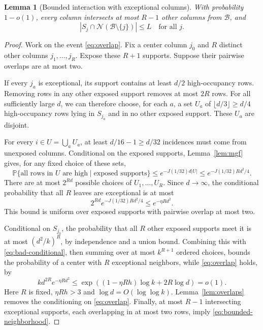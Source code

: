 \documentclass[11pt]{article}
\newtheorem{lemma}[theorem]{Lemma}
\theoremstyle{definition}
\theoremstyle{remark}
\newcommand{\PP}{\mathbb P}
\newcommand{\abs}[1]{\left\lvert #1\right\rvert}
\newcommand{\calB}{\mathcal B}
\newcommand{\calN}{\mathcal N}
\begin{document}
\begin{lemma}[Bounded interaction with exceptional columns]\label{lem:bad-neighbors}
With probability $1-o(1)$, every column intersects at most $R-1$ other columns from $\calB$, and
\begin{equation}\label{eq:bounded-neighborhood}
 \abs{S_j\cap\calN(\calB\setminus\{j\})}\leq L
 \quad\text{for all }j.
\end{equation}
\end{lemma}
\begin{proof}
Work on the event \eqref{eq:overlap}. Fix a center column $j_0$ and $R$ distinct other columns $j_1,\ldots,j_R$. Expose these $R+1$ supports. Suppose their pairwise overlaps are at most two.

If every $j_a$ is exceptional, its support contains at least $d/2$ high-occupancy rows. Removing rows in any other exposed support removes at most $2R$ rows. For all sufficiently large $d$, we can therefore choose, for each $a$, a set $U_a$ of $\lfloor d/3\rfloor\geq d/4$ high-occupancy rows lying in $S_{j_a}$ and in no other exposed support. These $U_a$ are disjoint.

For every $i\in U=\bigcup_a U_a$, at least $d/16-1\geq d/32$ incidences must come from unexposed columns. Conditional on the exposed supports, Lemma~\ref{lem:mgf} gives, for any fixed choice of these sets,
\[
 \PP\{\text{all rows in }U\text{ are high}\mid\text{exposed supports}\}
 \leq e^{-J(1/32)d\abs U}
 \leq e^{-J(1/32)R d^2/4}.
\]
There are at most $2^{Rd}$ possible choices of $U_1,\ldots,U_R$. Since $d\to\infty$, the conditional probability that all $R$ leaves are exceptional is at most
\begin{equation}\label{eq:bad-conditional}
 2^{Rd}e^{-J(1/32)R d^2/4}
 \leq e^{-\eta R d^2}.
\end{equation}
This bound is uniform over exposed supports with pairwise overlap at most two.

Conditional on $S_{j_0}$, the probability that all $R$ other exposed supports meet it is at most $(d^2/k)^R$, by independence and a union bound. Combining this with \eqref{eq:bad-conditional}, then summing over at most $k^{R+1}$ ordered choices, bounds the probability of a center with $R$ exceptional neighbors, while \eqref{eq:overlap} holds, by
\begin{equation}\label{eq:bad-neighbor-prob}
 k d^{2R}e^{-\eta R d^2}
 \leq\exp\!\left((1-\eta Rh)\log k+2R\log d\right)=o(1).
\end{equation}
Here $R$ is fixed, $\eta Rh>3$ and $\log d=O(\log\log k)$. Lemma~\ref{lem:overlaps} removes the conditioning on \eqref{eq:overlap}. Finally, at most $R-1$ intersecting exceptional supports, each overlapping in at most two rows, imply \eqref{eq:bounded-neighborhood}.
\end{proof}
\end{document}
